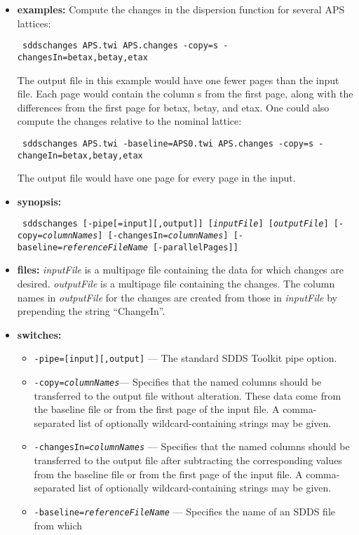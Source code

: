 \begin{itemize}
\item {\bf examples:} 
Compute the changes in the dispersion function for several APS lattices:
\begin{flushleft}{\tt
sddschanges APS.twi APS.changes -copy=s -changesIn=betax,betay,etax
}\end{flushleft}
The output file in this example would have one fewer pages than the input
file.  Each page would contain the column s from the first page, along with
the differences from the first page for betax, betay, and etax.
One could also compute the changes relative to the nominal lattice:
\begin{flushleft}{\tt
sddschanges APS.twi -baseline=APS0.twi APS.changes -copy=s -changeIn=betax,betay,etax
}\end{flushleft}
The output file would have one page for every page in the input.
\item {\bf synopsis:}
\begin{flushleft}{\tt
sddschanges [-pipe[=input][,output]] [{\em inputFile}] [{\em outputFile}]
[-copy={\em columnNames}] [-changesIn={\em columnNames}]
[-baseline={\em referenceFileName} [-parallelPages]] 
}\end{flushleft}
\item {\bf files:}
      {\em inputFile} is a multipage file containing the data for which changes are
      desired.  {\em outputFile} is a multipage file containing the changes.  The
      column names in {\em outputFile} for the changes are created from those in
      {\em inputFile} by prepending the string ``ChangeIn''.
\item {\bf switches:}
    \begin{itemize}
    \item {\tt -pipe=[input][,output]} --- The standard SDDS Toolkit pipe option.
    \item {\tt -copy={\em columnNames}}--- Specifies that the named columns should be transferred
        to the output file without alteration.  These data come from the baseline
        file or from the first page of the input file.  A comma-separated list of optionally wildcard-containing
        strings may be given.
    \item {\tt -changesIn={\em columnNames}} --- Specifies that the named columns should be
        transferred to the output file after subtracting the corresponding values
        from the baseline file or from the first page of the input file.
        A comma-separated list of optionally wildcard-containing
        strings may be given.
    \item {\tt -baseline={\em referenceFileName}} --- Specifies the name of an SDDS file from which

\end{itemize}
\end{itemize}
